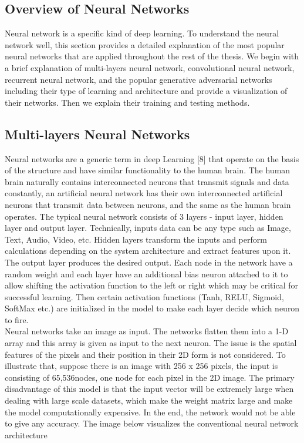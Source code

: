 \subsection{Overview of Neural Networks}
\hspace{5mm} Neural network is a specific kind of deep learning. To understand the neural network well, this section provides a detailed explanation of the most popular neural networks that are applied throughout the rest of the thesis. We begin with a brief explanation of multi-layers neural network, convolutional neural network, recurrent neural network, and the popular generative adversarial networks including their type of learning and architecture and provide a visualization of their networks. Then we explain their training and testing methods.
\subsection{Multi-layers Neural Networks}
\hspace{5mm} Neural networks are a generic term in deep Learning [8] that operate on the basis of the structure and have similar functionality to the human brain. The human brain naturally contains interconnected neurons that transmit signals and data constantly, an artificial neural network has their own interconnected artificial neurons that transmit data between neurons, and the same as the human brain operates. The typical neural network consists of 3 layers - input layer, hidden layer and output layer. Technically, inputs data can be any type such as Image, Text, Audio, Video, etc. Hidden layers transform the inputs and perform calculations depending on the system architecture and extract features upon it. The output layer produces the desired output. Each node in the network have a random weight and each layer have an additional bias neuron attached to it to allow shifting the activation function to the left or right which may be critical for successful learning. Then certain activation functions (Tanh, RELU, Sigmoid, SoftMax etc.) are initialized in the model to make each layer decide which neuron to fire.\\
Neural networks take an image as input. The networks flatten them into a 1-D array and this array is given as input to the next neuron. The issue is the spatial features of the pixels and their position in their 2D form is not considered. To illustrate that, suppose there is an image with 256 x 256 pixels, the input is consisting of 65,536nodes, one node for each pixel in the 2D image. The primary disadvantage of this model is that the input vector will be extremely large when dealing with large scale datasets, which make the weight matrix large and make the model computationally expensive. In the end, the network would not be able to give any accuracy. The image below visualizes the conventional neural network architecture 
